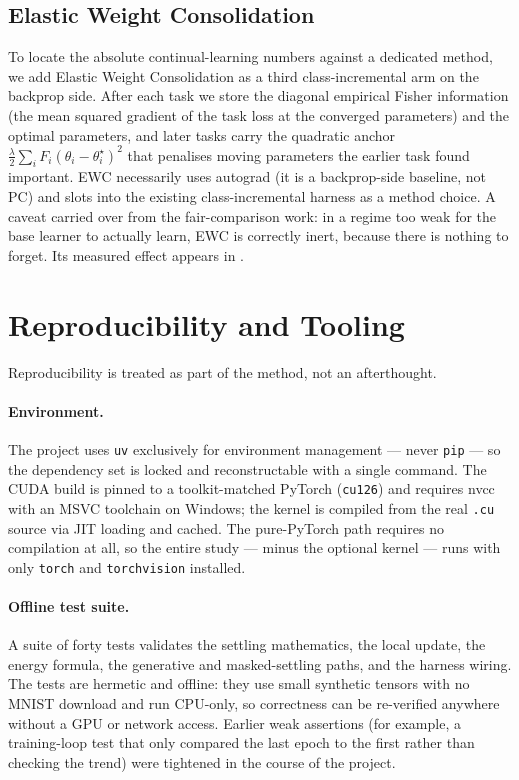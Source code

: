 \subsection{Elastic Weight Consolidation}

To locate the absolute continual-learning numbers against a dedicated method, we add Elastic Weight
Consolidation \citep{kirkpatrick2017ewc} as a third class-incremental arm on the backprop side. After
each task we store the diagonal empirical Fisher information (the mean squared gradient of the task loss
at the converged parameters) and the optimal parameters, and later tasks carry the quadratic anchor
$\tfrac{\lambda}{2}\sum_i F_i(\theta_i - \theta_i^\star)^2$ that penalises moving parameters the earlier
task found important. EWC necessarily uses autograd (it is a backprop-side baseline, not PC) and slots
into the existing class-incremental harness as a method choice. A caveat carried over from the
fair-comparison work: in a regime too weak for the base learner to actually learn, EWC is correctly
inert, because there is nothing to forget. Its measured effect appears in .

\section{Reproducibility and Tooling}\label{sec:method-repro}

Reproducibility is treated as part of the method, not an afterthought.

\paragraph{Environment.} The project uses \texttt{uv} exclusively for environment management --- never
\texttt{pip} --- so the dependency set is locked and reconstructable with a single command. The CUDA
build is pinned to a toolkit-matched PyTorch (\texttt{cu126}) and requires nvcc with an MSVC toolchain
on Windows; the kernel is compiled from the real \texttt{.cu} source via JIT loading and cached. The
pure-PyTorch path requires no compilation at all, so the entire study --- minus the optional kernel ---
runs with only \texttt{torch} and \texttt{torchvision} installed.

\paragraph{Offline test suite.} A suite of forty tests validates the settling mathematics, the local
update, the energy formula, the generative and masked-settling paths, and the harness wiring. The tests
are hermetic and offline: they use small synthetic tensors with no MNIST download and run CPU-only, so
correctness can be re-verified anywhere without a GPU or network access. Earlier weak assertions (for
example, a training-loop test that only compared the last epoch to the first rather than checking the
trend) were tightened in the course of the project.

